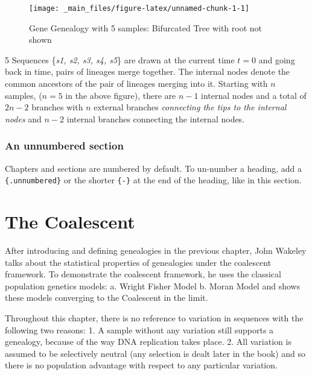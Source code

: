 \documentclass[
]{book}
\theoremstyle{definition}
\theoremstyle{definition}
\theoremstyle{definition}
\theoremstyle{definition}
\theoremstyle{remark}
\begin{document}
\begin{figure}

{\centering \texttt{[image: \_main\_files/figure-latex/unnamed-chunk-1-1]} 

}

\caption{Gene Genealogy with 5 samples: Bifurcated Tree with root not shown}\label{fig:unnamed-chunk-1}
\end{figure}

5 Sequences \{\emph{s1, s2, s3, s4, s5}\} are drawn at the current time \(t=0\) and going back in time, pairs of lineages merge together. The internal nodes denote the common ancestors of the pair of lineages merging into it. Starting with \(n\) samples, (\(n=5\) in the above figure), there are \(n-1\) internal nodes and a total of \(2n-2\) branches with \(n\) external branches \emph{connecting the tips to the internal nodes} and \(n-2\) internal branches connecting the internal nodes.

\hypertarget{an-unnumbered-section}{%
\subsection*{An unnumbered section}\label{an-unnumbered-section}}

Chapters and sections are numbered by default. To un-number a heading, add a \texttt{\{.unnumbered\}} or the shorter \texttt{\{-\}} at the end of the heading, like in this section.

\hypertarget{the-coalescent}{%
\chapter{The Coalescent}\label{the-coalescent}}

After introducing and defining genealogies in the previous chapter, John Wakeley talks about the statistical properties of genealogies under the coalescent framework. To demonstrate the coalescent framework, he uses the classical population genetics models: a. Wright Fisher Model b. Moran Model and shows these models converging to the Coalescent in the limit.

Throughout this chapter, there is no reference to variation in sequences with the following two reasons: 1. A sample without any variation still supports a genealogy, because of the way DNA replication takes place. 2. All variation is assumed to be selectively neutral (any selection is dealt later in the book) and so there is no population advantage with respect to any particular variation.
\end{document}
